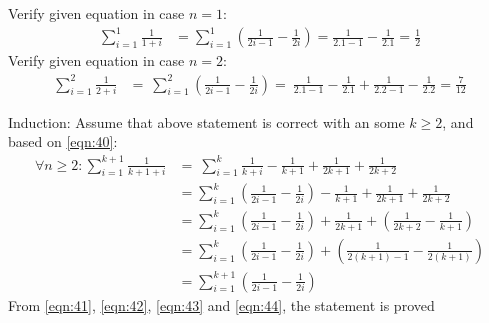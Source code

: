 \begin{enumerate}
    Verify given equation in case $n=1$:
        \begin{align}
            \displaystyle\sum^{1}_{i=1} \frac{1}{1+i} &= \displaystyle\sum^{1}_{i=1} (\frac{1}{2i-1}-\frac{1}{2i}) = \frac{1}{2.1-1}-\frac{1}{2.1} = \frac{1}{2} \label{eqn:42}
        \end{align}
    Verify given equation in case $n=2$:
        \begin{align}
            \displaystyle\sum^{2}_{i=1} \frac{1}{2+i} &=\
            \displaystyle\sum^{2}_{i=1} (\frac{1}{2i-1}-\frac{1}{2i}) =\ 
            \frac{1}{2.1-1}-\frac{1}{2.1} + \frac{1}{2.2-1}-\frac{1}{2.2} = \frac{7}{12} \label{eqn:43}
        \end{align}
    
    Induction: Assume that above statement is correct with an some $k \geq 2$, and based on \ref{eqn:40}:\\
    \begin{align}
        \forall n\geq 2: \displaystyle\sum^{k+1}_{i=1} \frac{1}{k+1+i} &=\
        \displaystyle\sum^{k}_{i=1} \frac{1}{k+i} -\frac{1}{k+1}+\frac{1}{2k+1}+\frac{1}{2k+2} \\
        &= \displaystyle\sum^{k}_{i=1} (\frac{1}{2i-1}-\frac{1}{2i}) -\frac{1}{k+1}+\frac{1}{2k+1}+\frac{1}{2k+2} \\
        &= \displaystyle\sum^{k}_{i=1} (\frac{1}{2i-1}-\frac{1}{2i}) +\frac{1}{2k+1}+(\frac{1}{2k+2}-\frac{1}{k+1}) \\
        &= \displaystyle\sum^{k}_{i=1} (\frac{1}{2i-1}-\frac{1}{2i}) +(\frac{1}{2(k+1)-1}-\frac{1}{2(k+1)}) \\
        &= \displaystyle\sum^{k+1}_{i=1} (\frac{1}{2i-1}-\frac{1}{2i}) \label{eqn:44}
    \end{align}
    From \ref{eqn:41}, \ref{eqn:42}, \ref{eqn:43} and \ref{eqn:44}, the statement is proved

\end{enumerate}
